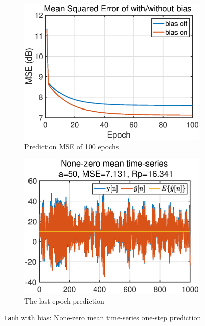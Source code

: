 \begin{figure}[htb]
     \centering
     \hspace{0.4cm}
     \begin{subfigure}[b]{0.4\textwidth}
         \centering
         \includegraphics[width=\textwidth]{fig/4/44a2.eps}
         \caption{Prediction MSE of 100 epochs}
         \label{fig.bia}
     \end{subfigure}
    \hspace{0.4cm}
     \begin{subfigure}[b]{0.4\textwidth}
         \centering
         \includegraphics[width=\textwidth]{fig/4/44a1.eps}
          \caption{The last epoch prediction}
         \label{fig.biasplot}
     \end{subfigure}
     \caption{\texttt{tanh} with bias: None-zero mean time-series one-step prediction}
     \label{fig:4_4}
\end{figure}
